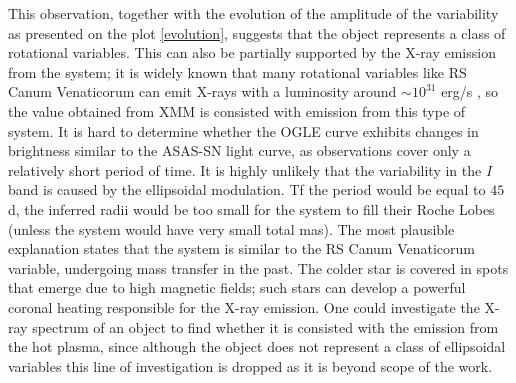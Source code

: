 \documentclass{pracalicmgr}
\begin{document}
This observation, together with the evolution of the amplitude of the variability as presented on the plot \ref{evolution},
suggests that the object represents a class of rotational variables.
This can also be partially supported by the X-ray emission from the system; it is widely known that many rotational variables like RS Canum Venaticorum can
emit X-rays with a luminosity around $\sim 10^{31}$ erg/s \citep{walter_x-rays_1980}, so the value obtained from XMM 
is consisted with emission from this type of system. It is hard to determine whether the OGLE curve exhibits changes in brightness similar to the ASAS-SN light curve,
as observations cover only a relatively short period of time. 
It is highly unlikely that the variability in the $I$ band is caused by the ellipsoidal modulation.
Tf the period would be equal to $45$ d, the inferred radii would be too small for the system to fill their Roche Lobes (unless the system would have very small total mas).
The most plausible explanation states that the system is similar to the RS Canum Venaticorum variable, undergoing mass transfer in the past.
The colder star is covered in spots that emerge due to high magnetic fields; such stars can develop a powerful coronal heating responsible for the X-ray emission.
One could investigate the X-ray spectrum of an object to find whether it is consisted with the emission from the hot plasma,
since although the object does not represent a class of ellipsoidal variables this line of investigation is dropped as it is beyond
scope of the work.%
\end{document}
